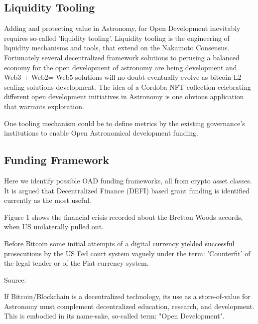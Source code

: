 \documentclass[final,5p,times,twocolumn,authoryear]{elsarticle}
\begin{document}
\subsection{Liquidity Tooling}
\label{btc2:sec:sub:liquidity}
Adding and protecting value in Astronomy, for Open Development inevitably requires so-called 'liquidity tooling'. Liquidity tooling is the engineering of liquidity mechanisms and tools, that extend on the Nakamoto Consensus. Fortunately several decentralized framework solutions to perusing a balanced economy for the open development of astronomy are being development and Web3 + Web2= Web5 solutions will no doubt eventually evolve as bitcoin L2 scaling solutions development. The idea of a Cordoba NFT collection celebrating different open development initiatives in Astronomy is one obvious application that warrants exploration. 

One tooling mechanism could be to define metrics by the existing governance's institutions to enable Open Astronomical development funding.
\subsection{Funding Framework}

Here we identify possible OAD funding frameworks, all from crypto asset classes.  It is argued that Decentralized Finance (DEFI) based grant funding is identified currently as the most useful.

Figure 1 shows the financial crisis recorded about the Bretton Woods accords, when US unilaterally pulled out.

Before Bitcoin some initial attempts of a digital currency yielded successful prosecutions by the US Fed court system vaguely under the term: 'Counterfit' of the legal tender or of the Fiat currency system. 

Source:  
 





If Bitcoin/Blockchain is a decentralized technology, its use as a store-of-value for Astronomy must complement decentralized education, research, and development. This is embodied in its name-sake, so-called term: "Open Development".
\end{document}
